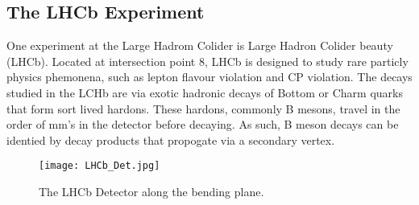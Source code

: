 
  \subsection{The LHCb Experiment}

    One experiment at the Large Hadrom Colider is Large Hadron Colider beauty (LHCb).
    Located at intersection point 8, LHCb is designed to study rare particly physics phemonena, such as lepton flavour violation and CP violation. 
    The decays studied in the LCHb are via exotic hadronic decays of Bottom or Charm quarks that form sort lived hardons. 
    These hardons, commonly B mesons, travel in the order of mm's in the detector before decaying. 
    As such, B meson decays can be identied by decay products that propogate via a secondary vertex.

    \begin{figure}[h!]
      \centering
      \texttt{[image: LHCb\_Det.jpg]}
      \caption{The LHCb Detector along the bending plane.}
      \label{fig:LHCb_Collab}
    \end{figure}\FloatBarrier

